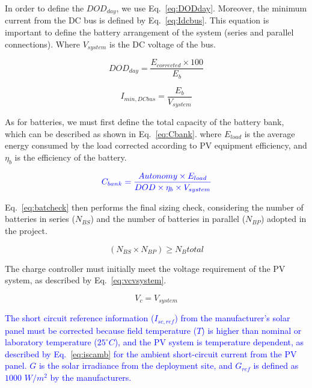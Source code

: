 \documentclass[12pt,a4paper]{article}
\begin{document}
In order to define the $DOD_{day}$, we use Eq.~\eqref{eq:DODday}. Moreover, the minimum current from the DC bus is defined by Eq.~\eqref{eq:Idcbus}. This equation is important to define the battery arrangement of the system (series and parallel connections). Where $V_{system}$ is the DC voltage of the bus.


\begin{equation}
\label{eq:DODday}
DOD_{day} = \dfrac{E_{corrected} \times 100}{E_{b}}
\end{equation}

\begin{equation}
\label{eq:Idcbus}
I_{min,DCbus} = \dfrac{E_{b}}{V_{system}}
\end{equation}

As for batteries, we must first define the total capacity of the battery bank, which can be described as shown in Eq.~\ref{eq:Cbank}. where $ E_{load} $ is the average energy consumed by the load corrected according to PV equipment efficiency, and $ \eta_{b} $ is the efficiency of the battery.

\begin{equation}
\label{eq:Cbank}
\textcolor{blue}{C_{bank} = \dfrac{Autonomy \times E_{load}}{DOD \times \eta_{b} \times V_{system}}}
\end{equation}

Eq.~\ref{eq:batcheck} then performs the final sizing check, considering the number of batteries in series ($ N_{BS} $) and the number of batteries in parallel ($ N_{BP} $) adopted in the project.

\begin{equation}
\label{eq:batcheck}
\left( N_{BS} \times N_{BP} \right) \geq N_{B}total
\end{equation}

The charge controller must initially meet the voltage requirement of the PV system, as described by Eq.~\eqref{eq:vcvsystem}.
 
\begin{equation}
\label{eq:vcvsystem}
V_{c} = V_{system}
\end{equation}

\textcolor{blue}{The short circuit reference information ($I_{sc,ref}$) from the manufacturer's solar panel must be corrected because field temperature ($T$) is higher than nominal or laboratory temperature ($25^{\circ}C$), and the PV system is temperature dependent, as described by Eq.~\eqref{eq:iscamb} for the ambient short-circuit current from the PV panel. $G$ is the solar irradiance from the deployment site, and $G_{ref}$ is defined as $1000$ $W/m^{2}$ by the manufacturers.}
\end{document}
